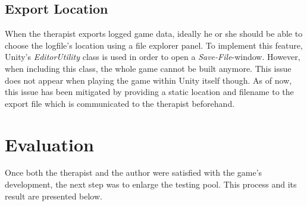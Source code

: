 \documentclass[draft,final]{vutinfth} %
\begin{document}
\subsection{Export Location}
When the therapist exports logged game data, ideally he or she should be able to choose the logfile's location using a file explorer panel. To implement this feature, Unity's \emph{EditorUtility} class is used in order to open a \emph{Save-File}-window. However, when including this class, the whole game cannot be built anymore. This issue does not appear when playing the game within Unity itself though. As of now, this issue has been mitigated by providing a static location and filename to the export file which is communicated to the therapist beforehand.
\section{Evaluation}
\label{chap:eval}
Once both the therapist and the author were satisfied with the game's development, the next step was to enlarge the testing pool. This process and its result are presented below.
\end{document}
